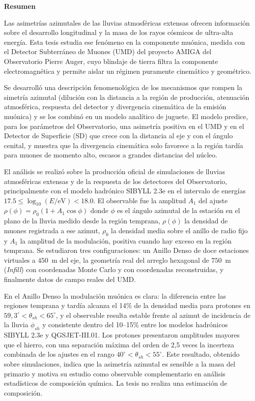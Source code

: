\documentclass[spanish,a4paper,12pt]{book}
\begin{document}
	
	\newpage
	\thispagestyle{empty}
	\vspace*{2cm}
	\begin{center}
		\Large \textbf{Resumen}
	\end{center}
	\vspace{1cm}
	
	Las asimetrías azimutales de las lluvias atmosféricas extensas ofrecen información sobre el desarrollo	longitudinal y la masa de los rayos cósmicos de ultra-alta energía. Esta tesis estudia ese fenómeno en la componente muónica, medida con el Detector Subterráneo de Muones (UMD) del proyecto AMIGA del Observatorio Pierre Auger, cuyo blindaje de tierra filtra la componente electromagnética y permite aislar
	un régimen puramente cinemático y geométrico.	
	
	Se desarrolló una descripción fenomenológica de los mecanismos que rompen la simetría azimutal (dilución con la distancia a la región de producción, atenuación atmosférica, respuesta del detector y divergencia cinemática de la emisión muónica) y se los combinó en un modelo analítico de juguete. El	modelo predice, para los parámetros del Observatorio, una asimetría positiva en el UMD y en el Detector de Superficie (SD) que crece con la distancia al eje y con el ángulo cenital, y muestra que la divergencia
	cinemática solo favorece a la región tardía para muones de momento alto, escasos a grandes distancias del núcleo.
	
	El análisis se realizó sobre la producción oficial de simulaciones de lluvias atmosféricas extensas y de la respuesta de los detectores del Observatorio, principalmente con el modelo hadrónico SIBYLL 2.3e en el intervalo de energías $17.5\leq\log_{10}(E/\mathrm{eV})<18.0$. El observable fue la amplitud $A_1$ del ajuste $\rho(\phi)=\rho_0(1+A_1\cos\phi)$ donde $\phi$ es el ángulo azimutal de la estación en el plano de la lluvia medido desde la región temprana, $\rho(\phi)$ la densidad de muones registrada a ese azimut, $\rho_0$ la densidad media sobre el anillo de radio fijo y $A_1$ la amplitud de la modulación, positiva cuando hay exceso en la región temprana. Se estudiaron tres configuraciones: un Anillo Denso de doce estaciones virtuales a $450$~m del eje, la geometría real del arreglo hexagonal de $750$~m (\textit{Infill}) con coordenadas Monte Carlo y con coordenadas reconstruidas, y finalmente datos de campo reales del UMD.
	
	En el Anillo Denso la modulación muónica es clara: la diferencia entre las regiones temprana y tardía alcanza el 14\% de la densidad media para protones en $59,3^\circ < \theta_{sh} < 65^\circ$, y el observable resulta estable	frente al azimut de incidencia de la lluvia $\phi_{sh}$ y consistente dentro del 10–15\% entre los modelos hadrónicos SIBYLL 2.3e y QGSJET-III.01. Los protones presentaron amplitudes mayores que el hierro, con una separación máxima del orden de 2,5 veces la incerteza combinada de los ajustes en el rango $40^\circ < \theta_{sh} < 55^\circ$. Este resultado, obtenido sobre simulaciones, indica que la asimetría azimutal es sensible a la masa
	del primario y motiva su estudio como observable complementario en análisis estadísticos de	composición química. La tesis no realiza una estimación de composición. 
	
\end{document}

